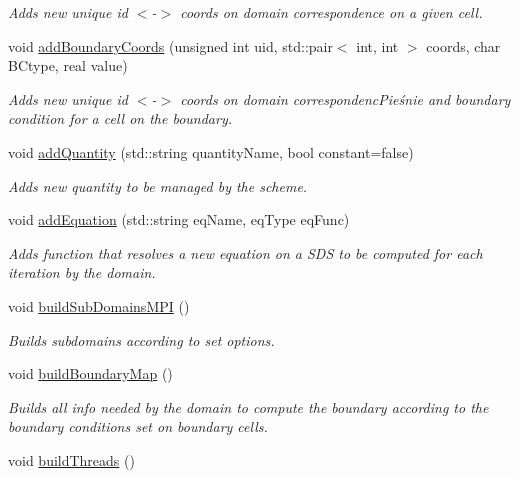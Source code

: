 \begin{DoxyCompactItemize}
\begin{DoxyCompactList}\small\item\em Adds new unique id $<$-\/$>$ coords on domain correspondence on a given cell. \end{DoxyCompactList}\item 
void \hyperlink{classDomain_a139f4270151467a3380922e98c644f79}{add\+Boundary\+Coords} (unsigned int uid, std\+::pair$<$ int, int $>$ coords, char B\+Ctype, real value)
\begin{DoxyCompactList}\small\item\em Adds new unique id $<$-\/$>$ coords on domain correspondenc\+Pieśnie and boundary condition for a cell on the boundary. \end{DoxyCompactList}\item 
void \hyperlink{classDomain_a4bad9ce1ce7d7fc7ef5b564bd5ac21e1}{add\+Quantity} (std\+::string quantity\+Name, bool constant=false)
\begin{DoxyCompactList}\small\item\em Adds new quantity to be managed by the scheme. \end{DoxyCompactList}\item 
void \hyperlink{classDomain_a3be46362fe91960104764d9eb89f1d29}{add\+Equation} (std\+::string eq\+Name, eq\+Type eq\+Func)
\begin{DoxyCompactList}\small\item\em Adds function that resolves a new equation on a S\+DS to be computed for each iteration by the domain. \end{DoxyCompactList}\item 
void \hyperlink{classDomain_af1262b85d13fbbf90388e453d9602372}{build\+Sub\+Domains\+M\+PI} ()
\begin{DoxyCompactList}\small\item\em Builds subdomains according to set options. \end{DoxyCompactList}\item 
\mbox{\label{classDomain_a4d1ecd27481f6c7c0b077225fa48bc99}} 
void \hyperlink{classDomain_a4d1ecd27481f6c7c0b077225fa48bc99}{build\+Boundary\+Map} ()
\begin{DoxyCompactList}\small\item\em Builds all info needed by the domain to compute the boundary according to the boundary conditions set on boundary cells. \end{DoxyCompactList}\item 
void \hyperlink{classDomain_aa2e6cebf44a57323f3c6344d131126c1}{build\+Threads} ()

\end{DoxyCompactItemize}
